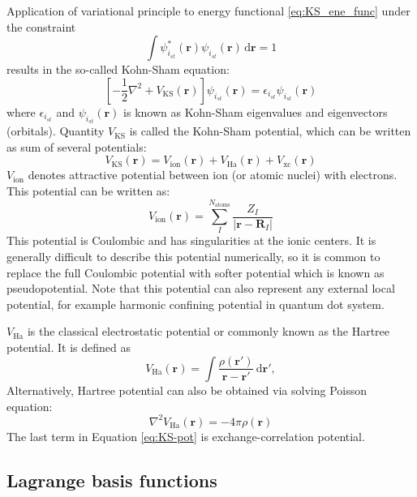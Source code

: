 Application of variational principle to energy functional \ref{eq:KS_ene_func}
under the constraint
\begin{equation}
\int \psi^{*}_{i_{st}}(\mathbf{r}) \psi_{i_{st}}(\mathbf{r})\,\mathrm{d}\mathbf{r} = 1
\end{equation}
results in the so-called Kohn-Sham equation:
\begin{equation}
\left[
-\frac{1}{2}\nabla^2  + V_{\mathrm{KS}}(\mathbf{r})
\right] \psi_{i_{st}}(\mathbf{r}) =
\epsilon_{i_{st}}\psi_{i_{st}}(\mathbf{r})
\end{equation}
where $\epsilon_{i_{st}}$ and $\psi_{i_{st}}(\mathbf{r})$ is known as Kohn-Sham
eigenvalues and eigenvectors (orbitals).
Quantity $V_{\mathrm{KS}}$ is called the Kohn-Sham potential, which can be
written as sum of several potentials:
\begin{equation}
V_{\mathrm{KS}}(\mathbf{r}) = V_{\mathrm{ion}}(\mathbf{r}) + V_{\mathrm{Ha}}(\mathbf{r})
+ V_{\mathrm{xc}}(\mathbf{r})
\label{eq:KS-pot}
\end{equation}
%
$V_{\mathrm{ion}}$ denotes attractive potential between ion (or atomic nuclei)
with electrons. This potential can be written as:
\begin{equation}
V_{\mathrm{ion}}(\mathbf{r}) =
\sum_{I}^{N_{\mathrm{atoms}}}
\frac{Z_{I}}{ \left| \mathbf{r} - \mathbf{R}_{I} \right| }
\end{equation}
This potential is Coulombic and has singularities
at the ionic centers. It is generally difficult to describe this potential
numerically, so it is common to replace the full Coulombic potential
with softer potential which is known as pseudopotential.
Note that this potential can also represent any external local potential, for
example harmonic confining potential in quantum dot system.

$V_{\mathrm{Ha}}$ is the classical electrostatic potential or commonly known
as the Hartree potential. It is defined as
\begin{equation}
V_{\mathrm{Ha}}(\mathbf{r}) = \int
\frac{\rho(\mathbf{r}')}
{\mathbf{r} - \mathbf{r}'}\,\mathrm{d}\mathbf{r}',
\end{equation}
Alternatively, Hartree potential can also be obtained via solving Poisson equation:
\begin{equation}
\nabla^{2} V_{\mathrm{Ha}}(\mathbf{r}) = -4\pi \rho(\mathbf{r})
\end{equation}
The last term in Equation \eqref{eq:KS-pot} is exchange-correlation potential.

\subsection{Lagrange basis functions}


